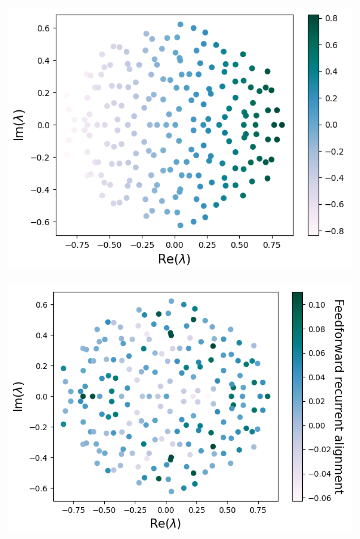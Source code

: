 \documentclass[11pt]{article}
\begin{document}
		\begin{figure}[H]
			\centering
			\begin{subfigure}[b]{0.4\textwidth}
				\includegraphics[width=\textwidth]{../figures/ffrec_eigval_real_part.png}
				\caption{}
				\label{fig:ffrec_real_part}
			\end{subfigure}
			\begin{subfigure}[b]{0.425\textwidth}
				\includegraphics[width=\textwidth]{../figures/ffrec_eigval_mag.png}
				\caption{}
				\label{fig:ffrec_mag}
			\end{subfigure}

\end{figure}
\end{document}
